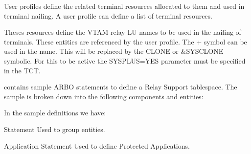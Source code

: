\documentclass[letterpaper,10pt,english]{sphinxmanual}
\begin{document}
\sphinxAtStartPar
{}
User profiles define the related terminal resources allocated to them and used in terminal nailing. A user profile can define a list of terminal resources.

\sphinxAtStartPar
{}
Theses resources define the VTAM relay LU names to be used in the nailing of terminals. These entities are referenced by the user profile. The + symbol can be used in the name. This will be replaced by the CLONE or \&SYSCLONE symbolic. For this to be active the SYSPLUS=YES parameter must be specified in the TCT.

\newpage

\sphinxAtStartPar
{} contains sample ARBO statements to define a Relay Support tablespace. The sample is broken down into the following components and entities: \sphinxhyphen{}

\sphinxAtStartPar
In the sample definitions we have: \sphinxhyphen{}

\sphinxAtStartPar
{} Statement \textendash{} Used to group entities.

\begin{sphinxVerbatim}[commandchars=\\\{\}]
        
          
            
\end{sphinxVerbatim}

\sphinxAtStartPar
Application  Statement \textendash{} Used to define Protected Applications.

\begin{sphinxVerbatim}[commandchars=\\\{\}]
       
            
            
               
\end{sphinxVerbatim}
\end{document}
